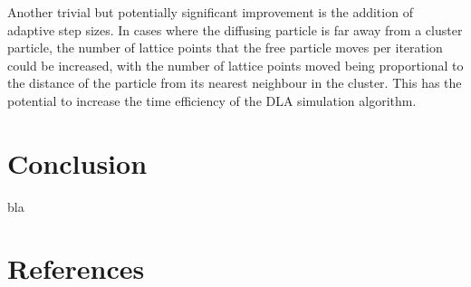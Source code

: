 \documentclass[11pt]{iopart}
\begin{document}
Another trivial but potentially significant improvement is the addition of adaptive step sizes. In cases where the diffusing particle is far away from a cluster particle, the number of lattice points that the free particle moves per iteration could be increased, with the number of lattice points moved being proportional to the distance of the particle from its nearest neighbour in the cluster. This has the potential to increase the time efficiency of the DLA simulation algorithm.

\section{Conclusion}
bla

\section*{References}


\end{document}
